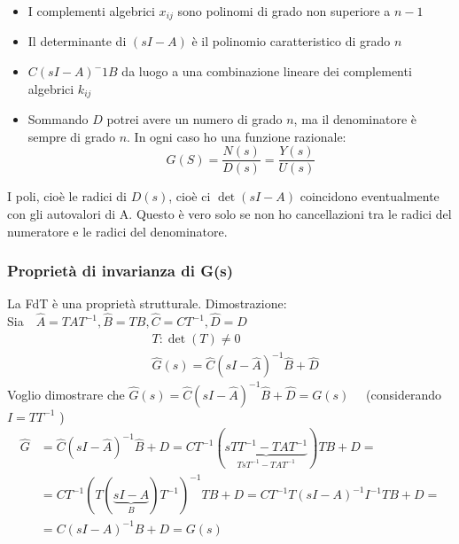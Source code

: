 	\begin{itemize}
		\item I complementi algebrici $ x_{ij} $ sono polinomi di grado non superiore a $ n-1 $
		\item Il determinante di $ (sI -A ) $ è il polinomio caratteristico di grado $ n $
		\item $ C(sI-A)^-1B $ da luogo a una combinazione lineare dei complementi algebrici $ k_{ij} $
		\item Sommando $ D $ potrei avere un numero di grado $ n $, ma il denominatore è sempre di grado $ n $. In ogni caso ho una funzione razionale:
		\[G(S) = \frac{N(s)}{D(s)} = \frac{Y(s)}{U(s)}\]
	\end{itemize}
	I poli, cioè le radici di $ D(s) $, cioè ci $ \det(sI-A) $ coincidono eventualmente con gli autovalori di A. Questo è vero solo se non ho cancellazioni tra le radici del numeratore e le radici del denominatore.
	\subsubsection{Proprietà di invarianza di G(s)}
	La FdT è una proprietà strutturale. Dimostrazione:
	\\Sia$ \quad \hat{A}=T A T^{-1}, \hat{B}=T B, \hat{C}=C T^{-1}, \hat{D}=D$
	\[
	\begin{aligned}
		& T: \operatorname{det}(T) \neq 0 \\
		& \hat{G}(s)=\hat{C}(s I-\hat{A})^{-1} \hat{B}+\hat{D}
	\end{aligned}
	\]
	Voglio dimostrare che $\hat{G}(s)=\hat{C}(s I-\hat{A})^{-1} \hat{B}+\hat{D}=G(s) \quad$ (considerando $I=TT^{-1}$ )
	\[
	\begin{aligned}
		\hat{G} & =\hat{C}(s I-\hat{A})^{-1} \hat{B}+D=C T^{-1}(\underbrace{s T T^{-1}-T A T^{-1}}_{T s T^{-1}-T A T^{-1}}) T B+D= \\
		& =C T^{-1}(T(\underbrace{s I-A}_B) T^{-1})^{-1} T B+D=C T^{-1} T(s I-A)^{-1} I^{-1} T B+D= \\
		& =C(s I-A)^{-1} B+D=G(s) 
	\end{aligned}
	\]
